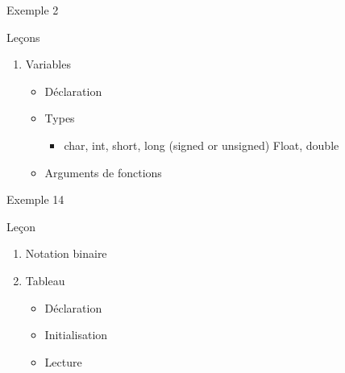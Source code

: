\begin{frame}{Exemple 2}



\end{frame}

\begin{frame}{Leçons}

\begin{enumerate}
\def\labelenumi{\arabic{enumi}.}
\itemsep1pt\parskip0pt
\item
  Variables

  \begin{itemize}
  \itemsep1pt\parskip0pt
  \item
    Déclaration
  \item
    Types

    \begin{itemize}
    \itemsep1pt\parskip0pt
    \item
      char, int, short, long (signed or unsigned) Float, double\\
    \end{itemize}
  \item
    Arguments de fonctions
  \end{itemize}
\end{enumerate}

\end{frame}

\begin{frame}{Exemple 14}



\end{frame}

\begin{frame}{Leçon}

\begin{enumerate}
\def\labelenumi{\arabic{enumi}.}
\itemsep1pt\parskip0pt
\item
  Notation binaire
\item
  Tableau

  \begin{itemize}
  \itemsep1pt\parskip0pt
  \item
    Déclaration
  \item
    Initialisation
  \item
    Lecture
  \end{itemize}
\end{enumerate}

\end{frame}
